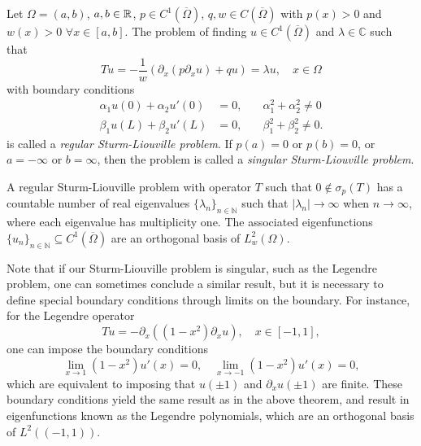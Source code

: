\begin{definition}\label{def:regular-sturm-liouville}
    Let $\Omega = (a,b)$, $a,b\in\mathbb{R}$, $p\in C^1(\overline{\Omega})$, $q,w\in C(\overline{\Omega})$  with $p(x)>0$ and $w(x)>0$ $\forall x\in[a,b]$. The problem of finding $u\in C^1(\overline{\Omega})$ and $\lambda\in\mathbb{C}$ such that 
    \begin{equation}\label{eq:regular-sturm-liouville-operator}
        Tu = -\frac{1}{w}(\partial_x(p\partial_x u) + qu) = \lambda u,\quad x\in\Omega
    \end{equation}
    with boundary conditions
    \begin{equation}\label{eq:regular-sturm-liouville-bcs}
        \begin{aligned}
            \alpha_1 u(0) + \alpha_2 u'(0)&=0, &\quad \alpha_1^2 + \alpha_2^2 \neq 0\\
            \beta_1 u(L) + \beta_2 u'(L)&=0, &\quad \beta_1^2 + \beta_2^2 \neq 0.
        \end{aligned}
    \end{equation}
    is called a \emph{regular Sturm-Liouville problem}. If $p(a)=0$ or $p(b)=0$, or $a=-\infty$ or $b=\infty$, then the problem is called a \emph{singular Sturm-Liouville problem}.
\end{definition}
\begin{theorem}\label{thm:sturm-liouville-eigenfunctions}
    A regular Sturm-Liouville problem with operator $T$ such that $0\notin \sigma_p(T)$ has a countable number of real eigenvalues $\{\lambda_n\}_{n\in\mathbb N}$ such that $|\lambda_n|\to\infty$ when $n\to\infty$, where each eigenvalue has multiplicity one. The associated eigenfunctions $\{u_n\}_{n\in\mathbb N}\subseteq C^1(\overline{\Omega})$ are an orthogonal basis of $L^2_w(\Omega)$. 
\end{theorem}

Note that if our Sturm-Liouville problem is singular, such as the Legendre problem, one can sometimes conclude a similar result, but it is necessary to define special boundary conditions through limits on the boundary. For instance, for the Legendre operator 
\begin{equation*}
    Tu = -\partial_x ((1-x^2)\partial_x u),\quad x\in[-1,1],
\end{equation*}
one can impose the boundary conditions 
\begin{equation*}
    \lim_{x\to 1}(1-x^2)u'(x)=0,\quad \lim_{x\to -1}(1-x^2)u'(x)=0,
\end{equation*}
which are equivalent to imposing that $u(\pm 1)$ and $\partial_x u(\pm 1)$ are finite. These boundary conditions yield the same result as in the above theorem, and result in  eigenfunctions known as the Legendre polynomials, which are an orthogonal basis of $L^2((-1,1))$. 

